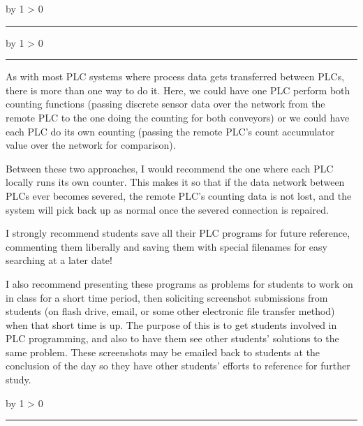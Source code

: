 \documentclass[12pt,a4paper]{article}
\def\oppgave{
            \advance\questnum by 1
            \ifnum \questnum > 0
                 \hrule
                 \vskip 3pt
                 \leftline{Oppgave \the\questnum}
                 \vskip 3pt \fi}
\def\svar{
           \advance\answnum by 1
           \ifnum \answnum > 0
                \hrule
                \vskip 3pt
                \leftline{Svar \the\answnum}
                \vskip 3pt \fi}
\def\notes{
           \advance\explnum by 1
           \ifnum \explnum > 0
                \hrule
                \vskip 3pt
                \leftline{Notes \the\explnum}
                \vskip 3pt \fi}
\begin{document}
\vfil 

\eject
\vskip 10pt \filbreak 





\svar{} 


\vskip 10pt \filbreak 





\notes{} 

As with most PLC systems where process data gets transferred between PLCs, there is more than one way to do it.  Here, we could have one PLC perform both counting functions (passing discrete sensor data over the network from the remote PLC to the one doing the counting for both conveyors) or we could have each PLC do its own counting (passing the remote PLC's count accumulator value over the network for comparison).

Between these two approaches, I would recommend the one where each PLC locally runs its own counter.  This makes it so that if the data network between PLCs ever becomes severed, the remote PLC's counting data is not lost, and the system will pick back up as normal once the severed connection is repaired.

\vskip 10pt

I strongly recommend students save all their PLC programs for future reference, commenting them liberally and saving them with special filenames for easy searching at a later date!

\vskip 10pt

I also recommend presenting these programs as problems for students to work on in class for a short time period, then soliciting screenshot submissions from students (on flash drive, email, or some other electronic file transfer method) when that short time is up.  The purpose of this is to get students involved in PLC programming, and also to have them see other students' solutions to the same problem.  These screenshots may be emailed back to students at the conclusion of the day so they have other students' efforts to reference for further study.



\vfil \eject 



\oppgave{} 
\end{document}
